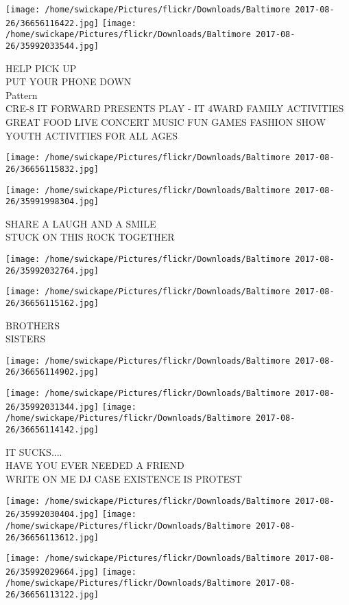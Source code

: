 \documentclass[10pt,letterpaper]{article}
\begin{document}
\texttt{[image: /home/swickape/Pictures/flickr/Downloads/Baltimore 2017-08-26/36656116422.jpg]}
\texttt{[image: /home/swickape/Pictures/flickr/Downloads/Baltimore 2017-08-26/35992033544.jpg]}

HELP PICK UP\\
PUT YOUR PHONE DOWN\\
Pattern\\
CRE{-}8 IT FORWARD PRESENTS PLAY {-} IT 4WARD FAMILY ACTIVITIES GREAT FOOD LIVE CONCERT MUSIC FUN GAMES FASHION SHOW YOUTH ACTIVITIES FOR ALL AGES
\pagebreak

\texttt{[image: /home/swickape/Pictures/flickr/Downloads/Baltimore 2017-08-26/36656115832.jpg]}

\vspace{0.25in}
\texttt{[image: /home/swickape/Pictures/flickr/Downloads/Baltimore 2017-08-26/35991998304.jpg]}

SHARE A LAUGH AND A SMILE\\
STUCK ON THIS ROCK TOGETHER
\pagebreak

\texttt{[image: /home/swickape/Pictures/flickr/Downloads/Baltimore 2017-08-26/35992032764.jpg]}

\vspace{0.25in}
\texttt{[image: /home/swickape/Pictures/flickr/Downloads/Baltimore 2017-08-26/36656115162.jpg]}

BROTHERS\\
SISTERS
\pagebreak

\texttt{[image: /home/swickape/Pictures/flickr/Downloads/Baltimore 2017-08-26/36656114902.jpg]}

\vspace{0.25in}
\texttt{[image: /home/swickape/Pictures/flickr/Downloads/Baltimore 2017-08-26/35992031344.jpg]}
\texttt{[image: /home/swickape/Pictures/flickr/Downloads/Baltimore 2017-08-26/36656114142.jpg]}

IT SUCKS....\\
HAVE YOU EVER NEEDED A FRIEND\\
WRITE ON ME DJ CASE EXISTENCE IS PROTEST
\pagebreak

\texttt{[image: /home/swickape/Pictures/flickr/Downloads/Baltimore 2017-08-26/35992030404.jpg]}
\texttt{[image: /home/swickape/Pictures/flickr/Downloads/Baltimore 2017-08-26/36656113612.jpg]}

\texttt{[image: /home/swickape/Pictures/flickr/Downloads/Baltimore 2017-08-26/35992029664.jpg]}
\texttt{[image: /home/swickape/Pictures/flickr/Downloads/Baltimore 2017-08-26/36656113122.jpg]}
\end{document}
